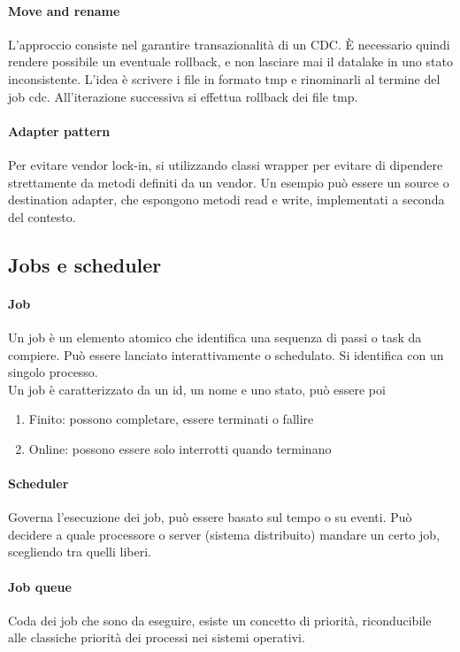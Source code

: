 \documentclass[a4paper]{article}
\begin{document}
\paragraph{Move and rename}
L'approccio consiste nel garantire transazionalità di un CDC. 
È necessario quindi rendere possibile un eventuale rollback, e non lasciare mai 
il datalake in uno stato inconsistente.
L'idea è scrivere i file in formato tmp e rinominarli al termine del job cdc.
All'iterazione successiva si effettua rollback dei file tmp.

\paragraph{Adapter pattern}
Per evitare vendor lock-in, si utilizzando classi wrapper per evitare di dipendere
strettamente da metodi definiti da un vendor.
Un esempio può essere un source o destination adapter, che espongono metodi read e 
write, implementati a seconda del contesto.

\subsection{Jobs e scheduler}
\paragraph{Job}
Un job è un elemento atomico che identifica una sequenza di passi o task da compiere. Può essere lanciato interattivamente o schedulato. Si identifica con 
un singolo processo.\\
Un job è caratterizzato da un id, un nome e uno stato, può essere poi 
\begin{enumerate}
    \item Finito: possono completare, essere terminati o fallire
    \item Online: possono essere solo interrotti quando terminano
\end{enumerate}

\paragraph{Scheduler}
Governa l'esecuzione dei job, può essere basato sul tempo o su eventi.
Può decidere a quale processore o server (sistema distribuito) mandare un certo job, scegliendo tra quelli liberi.

\paragraph{Job queue}
Coda dei job che sono da eseguire, esiste un concetto di priorità, riconducibile alle classiche priorità dei processi nei sistemi operativi.
\end{document}
